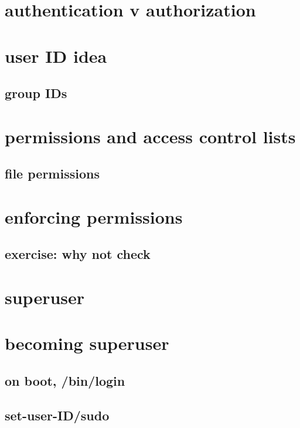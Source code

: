
\section{authentication v authorization}


\section{user ID idea}


\subsection{group IDs}


\section{permissions and access control lists}
\subsection{file permissions}


\section{enforcing permissions}


\subsection{exercise: why not check}


\section{superuser}


\section{becoming superuser}

\subsection{on boot, /bin/login}


\subsection{set-user-ID/sudo}


